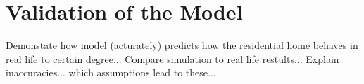 \chapter{Validation of the Model}\label{ch:validmodel} 
Demonstate how model (acturately) predicts how the residential home behaves in real life to certain degree...
Compare simulation to real life restults...
Explain inaccuracies... which assumptions lead to these...